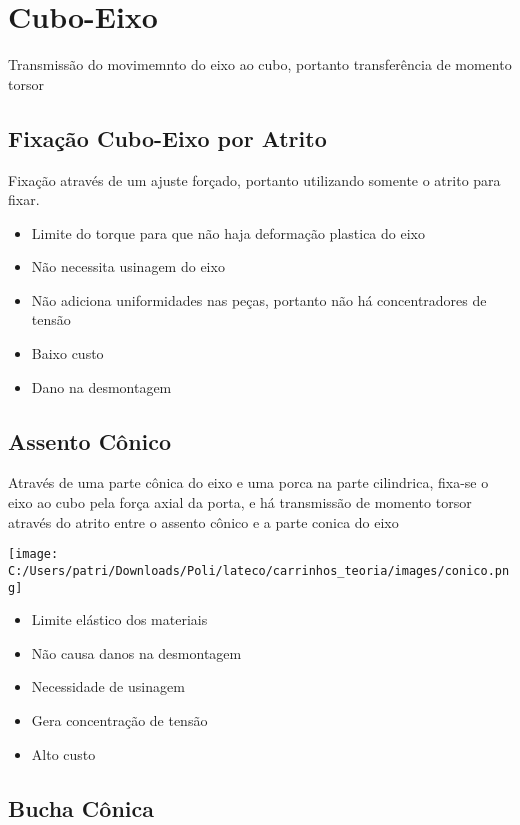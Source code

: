 \section{Cubo-Eixo}

Transmissão do movimemnto do eixo ao cubo, portanto transferência de momento torsor

\subsection{Fixação Cubo-Eixo por Atrito}

Fixação através de um ajuste forçado, portanto utilizando somente o atrito para fixar.

\begin{itemize}
	\item Limite do torque para que não haja deformação plastica do eixo
	\item Não necessita usinagem do eixo
	\item Não adiciona uniformidades nas peças, portanto não há concentradores de tensão
	\item Baixo custo
	\item Dano na desmontagem
\end{itemize}

\subsection{Assento Cônico}

Através de uma parte cônica do eixo e uma porca na parte cilindrica, fixa-se o eixo ao cubo pela força axial da porta, e há transmissão de momento torsor através do atrito entre o assento cônico e a parte conica do eixo

\texttt{[image: C:/Users/patri/Downloads/Poli/lateco/carrinhos\_teoria/images/conico.png]}

\begin{itemize}
	\item Limite elástico dos materiais
	\item Não causa danos na desmontagem
	\item Necessidade de usinagem
	\item Gera concentração de tensão
	\item Alto custo
\end{itemize}

\subsection{Bucha Cônica}

